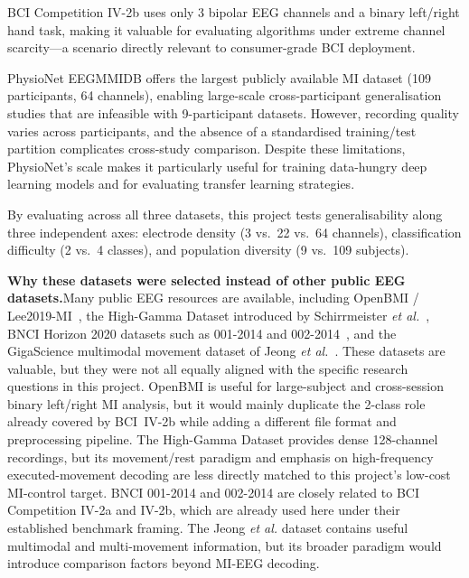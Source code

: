 \documentclass[12pt, a4paper]{article}
\begin{document}
BCI Competition IV-2b uses only 3 bipolar EEG channels and a binary left/right hand task, making it valuable for evaluating algorithms under extreme channel scarcity---a scenario directly relevant to consumer-grade BCI deployment.

PhysioNet EEGMMIDB offers the largest publicly available MI dataset (109 participants, 64 channels), enabling large-scale cross-participant generalisation studies that are infeasible with 9-participant datasets. However, recording quality varies across participants, and the absence of a standardised training/test partition complicates cross-study comparison. Despite these limitations, PhysioNet's scale makes it particularly useful for training data-hungry deep learning models and for evaluating transfer learning strategies.

By evaluating across all three datasets, this project tests generalisability along three independent axes: electrode density (3 vs.\ 22 vs.\ 64 channels), classification difficulty (2 vs.\ 4 classes), and population diversity (9 vs.\ 109 subjects).

\textbf{Why these datasets were selected instead of other public EEG datasets.}\quad Many public EEG resources are available, including OpenBMI / Lee2019-MI~\cite{lee2019openbmi}, the High-Gamma Dataset introduced by Schirrmeister \emph{et al.}~\cite{schirrmeister2017deep}, BNCI Horizon 2020 datasets such as 001-2014 and 002-2014~\cite{bnci2020datasets}, and the GigaScience multimodal movement dataset of Jeong \emph{et al.}~\cite{jeong2020multimodal}. These datasets are valuable, but they were not all equally aligned with the specific research questions in this project. OpenBMI is useful for large-subject and cross-session binary left/right MI analysis, but it would mainly duplicate the 2-class role already covered by BCI~IV-2b while adding a different file format and preprocessing pipeline. The High-Gamma Dataset provides dense 128-channel recordings, but its movement/rest paradigm and emphasis on high-frequency executed-movement decoding are less directly matched to this project's low-cost MI-control target. BNCI 001-2014 and 002-2014 are closely related to BCI Competition IV-2a and IV-2b, which are already used here under their established benchmark framing. The Jeong \emph{et al.} dataset contains useful multimodal and multi-movement information, but its broader paradigm would introduce comparison factors beyond MI-EEG decoding.
\end{document}
